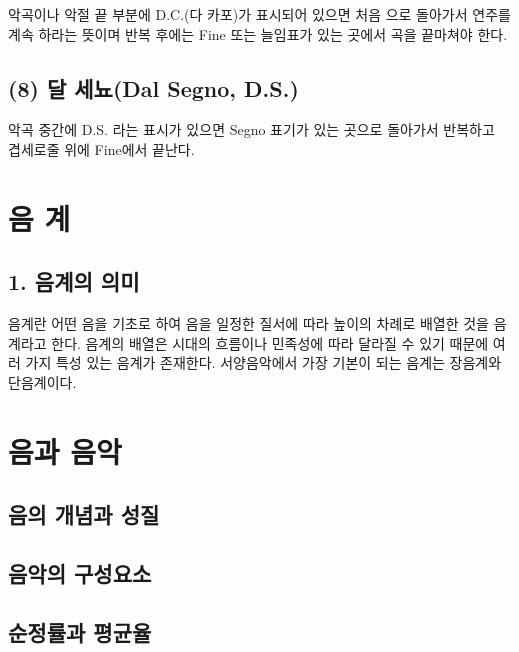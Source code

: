 \documentclass[12pt, a4paper, oneside]{book}
\let\stdsection\section
\renewcommand\section{\newpage\stdsection}
\begin{document}
악곡이나 악절 끝 부분에 D.C.(다 카포)가 표시되어 있으면 처음
으로 돌아가서 연주를 계속 하라는 뜻이며 반복 후에는 Fine
또는 늘임표가 있는 곳에서 곡을 끝마쳐야 한다. 

	\subsection{(8) 달 세뇨(Dal Segno, D.S.)}

악곡 중간에 D.S. 라는 표시가 있으면 Segno 표기가 있는 곳으로
돌아가서 반복하고 겹세로줄 위에 Fine에서 끝난다.

%
	\section{음 계}


	\subsection{1. 음계의 의미}

음계란 어떤 음을 기초로 하여 음을 일정한 질서에 따라
높이의 차례로 배열한 것을 음계라고 한다.
음계의 배열은 시대의 흐름이나 민족성에 따라 달라질 수
있기 때문에 여러 가지 특성 있는 음계가 존재한다.
서양음악에서 가장 기본이 되는 음계는 장음계와 단음계이다. 


%
	\section{음과 음악}

	\subsection{음의 개념과 성질}

	\subsection{음악의 구성요소}

	\subsection{순정률과 평균율}
\end{document}
